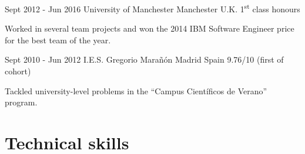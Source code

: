 \documentclass[10pt]{CurriculumVitae}
\begin{document}
      {Sept 2012 - Jun 2016}
      {University of Manchester}
      {Manchester}
      {U.K.}
      {1\textsuperscript{st} class honours}
      {
         \item Worked in several team projects and won the 2014 IBM Software Engineer price for the best team of the year.
      }

      {Sept 2010 - Jun 2012}
      {I.E.S. Gregorio Marañón}
      {Madrid}
      {Spain}
      {9.76/10 (first of cohort)}
      {
        \item Tackled university-level problems in the ``Campus Científicos de Verano'' program.
      }


  \section{Technical skills}
\end{document}

